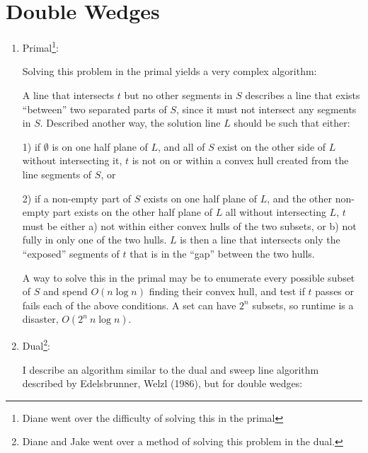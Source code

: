 \documentclass [12pt]{article}
\begin{document}
    


        
    \pagebreak



    \section{Double Wedges}
    \label{sec:three}

    \begin{enumerate}[label=\alph*.]
        \item Primal\footnote{Diane went over the difficulty of solving this in the primal}:
        
        Solving this problem in the primal yields a very complex algorithm:

        A line that intersects $t$ but no other segments in $S$ describes a line that exists ``between'' two separated parts of $S$, since it must not intersect any segments in $S$. Described another way, the solution line $L$ should be such that either: 
        
        1) if $\emptyset$ is on one half plane of $L$, and all of $S$ exist on the other side of $L$ without intersecting it, $t$ is not on or within a convex hull created from the line segments of $S$, or 

        2) if a non-empty part of $S$ exists on one half plane of $L$, and the other non-empty part exists on the other half plane of $L$ all without intersecting $L$, $t$ must be either a) not within either convex hulls of the two subsets, or b) not fully in only one of the two hulls. $L$ is then a line that intersects only the ``exposed'' segments of $t$ that is in the ``gap'' between the two hulls. 

        A way to solve this in the primal may be to enumerate every possible subset of $S$ and spend $O(n\log n)$ finding their convex hull, and test if $t$ passes or fails each of the above conditions. A set can have $2^n$ subsets, so runtime is a disaster, $O(2^n\ n \log n)$. 
        
        \item Dual\footnote{Diane and Jake went over a method of solving this problem in the dual.}:
        
        I describe an algorithm similar to the dual and sweep line algorithm described by Edelsbrunner, Welzl (1986), but for double wedges:
        

\end{enumerate}
\end{document}
